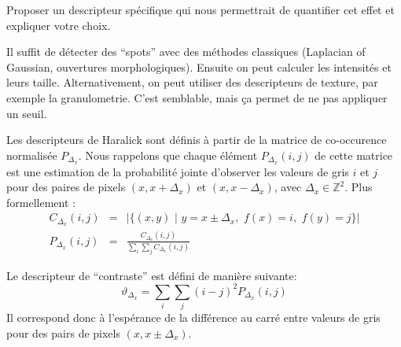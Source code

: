 \documentclass[11pt,addpoints]{exam}
\begin{document}
\begin{questions}
Proposer un descripteur spécifique qui nous permettrait de quantifier
cet effet et expliquer votre choix. 
\begin{solution}
Il suffit de détecter des ``spots'' avec des méthodes classiques
(Laplacian of Gaussian, ouvertures morphologiques). Ensuite on peut
calculer les intensités et leurs taille. Alternativement, on peut
utiliser des descripteurs de texture, par exemple la
granulometrie. C'est semblable, mais ça permet de ne pas appliquer un
seuil. 
\end{solution}

Les descripteurs de Haralick sont définis à partir de la matrice de
co-occurence normalisée $P_{\Delta_x}$. Nous rappelons que chaque élément
$P_{\Delta_x}(i,j)$ de cette matrice est une estimation de la probabilité jointe
d'observer les valeurs de gris $i$ et $j$ pour des paires de pixels
$(x,x+\Delta_x)$ et $(x,x-\Delta_x)$, avec $\Delta_x \in
\mathbb{Z}^2$. Plus formellement :  
\begin{eqnarray*}
C_{\Delta_x}(i,j) &=& |\{(x,y) \,\,| \,\, y=x \pm \Delta_x, \,\, f(x)=i,
\,\, f(y)=j \}| \\
P_{\Delta_x}(i,j) &=& \frac{C_{\Delta_x}(i,j)}{\sum_i\sum_j C_{\Delta_x}(i,j)}
\end{eqnarray*} 


Le descripteur de ``contraste'' est défini de manière suivante: 
\begin{equation}\label{equ:haralick_contrast}
\vartheta_{\Delta_x} = \sum_i\sum_j(i-j)^2P_{\Delta_x}(i,j)
\end{equation}
Il correspond donc à l'espérance de la différence au carré entre
valeurs de gris pour des pairs de pixels $(x, x \pm \Delta_x)$. 




\end{questions}
\end{document}
